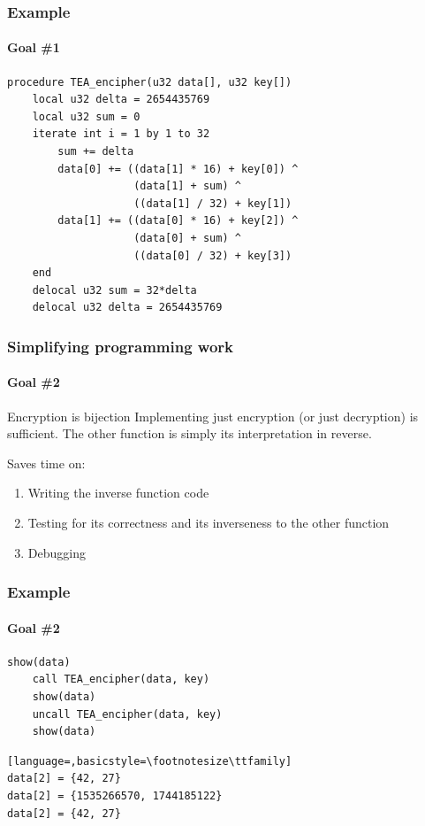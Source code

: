 \documentclass{beamer}
\begin{document}
\addtocounter{page}{1}
\begin{frame}[fragile]
\addtocounter{page}{-1}
\frametitle{Example}
\framesubtitle{\hspace{5mm}Goal \#1} 

\begin{lstlisting}[language=Janus]
procedure TEA_encipher(u32 data[], u32 key[])
    local u32 delta = 2654435769
    local u32 sum = 0
    iterate int i = 1 by 1 to 32
        sum += delta
        data[0] += ((data[1] * 16) + key[0]) ^
                    (data[1] + sum) ^
                    ((data[1] / 32) + key[1])
        data[1] += ((data[0] * 16) + key[2]) ^
                    (data[0] + sum) ^
                    ((data[0] / 32) + key[3])
    end
    delocal u32 sum = 32*delta
    delocal u32 delta = 2654435769
\end{lstlisting}


\end{frame}




\addtocounter{page}{1}
\begin{frame}
\addtocounter{page}{-1}
\frametitle{Simplifying programming work}
\framesubtitle{\hspace{5mm}Goal \#2} 

\pause
\begin{block}{Encryption is bijection}
Implementing just encryption (or just decryption) is sufficient. 
The other function is simply its interpretation in reverse.
\end{block}

\pause
\begin{block}{}
Saves time on:
\begin{enumerate}
\item Writing the inverse function code
\item Testing for its correctness and its inverseness to the other function
\item Debugging
\end{enumerate}
\end{block}

\end{frame}




\addtocounter{page}{1}
\begin{frame}[fragile]
\addtocounter{page}{-1}
\frametitle{Example}
\framesubtitle{\hspace{5mm}Goal \#2} 

\begin{lstlisting}[language=Janus]
    show(data)
    call TEA_encipher(data, key)
    show(data)
    uncall TEA_encipher(data, key)
    show(data)
\end{lstlisting}

\begin{lstlisting}[language=,basicstyle=\footnotesize\ttfamily]
data[2] = {42, 27}
data[2] = {1535266570, 1744185122}
data[2] = {42, 27}
\end{lstlisting}


\end{frame}
\end{document}

